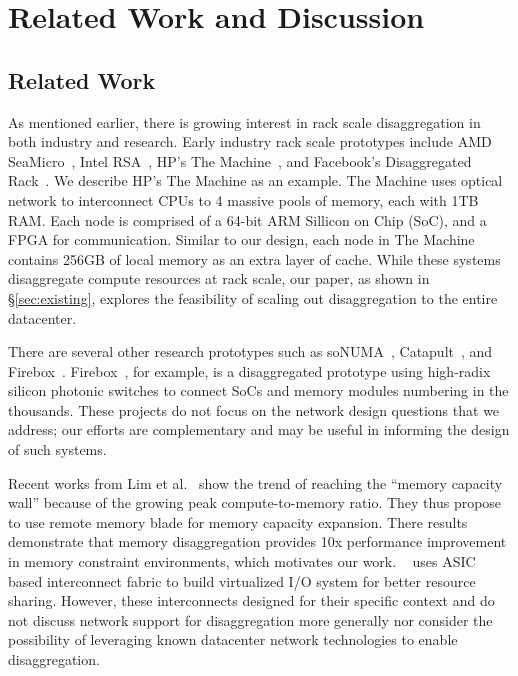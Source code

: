 \section{Related Work and Discussion}
\label{sec:discussion}

\subsection{Related Work}
 As mentioned earlier, there is growing interest in rack scale disaggregation in both industry and research.
Early industry rack scale prototypes include AMD SeaMicro~\cite{seamicro}, Intel RSA~\cite{rsa}, HP's The Machine~\cite{hptm}, and Facebook's Disaggregated Rack~\cite{fdr}.
We describe HP's The Machine as an example. 
The Machine uses optical network to interconnect CPUs to 4 massive pools of memory, each with 1TB RAM.
Each node is comprised of a 64-bit ARM Sillicon on Chip (SoC), and a FPGA for communication. 
Similar to our design, each node in The Machine contains 256GB of local memory as an extra layer of cache.
While these systems disaggregate compute resources at rack scale, our paper, as shown in \S \ref{sec:existing}, explores the feasibility of scaling out disaggregation to the entire datacenter.


There are several other research prototypes such as soNUMA~\cite{sonuma}, Catapult~\cite{catapult}, and Firebox~\cite{firebox}.
Firebox~\cite{firebox}, for example, is a disaggregated prototype using high-radix silicon photonic switches to connect SoCs and memory modules numbering in the thousands.
These projects do not focus on the network design questions that we address; our efforts are complementary and may be useful in informing the design of such systems.


Recent works from Lim et al.~\cite{ddcHwDesign1, ddcHwDesign2} show the trend of reaching the ``memory capacity wall'' because of the growing peak compute-to-memory ratio. 
They thus propose to use remote memory blade for memory capacity expansion. 
There results demonstrate that memory disaggregation provides 10x performance improvement in memory constraint environments, which motivates our work.
~\cite{ddcHwDesign3} uses ASIC based interconnect fabric to build virtualized I/O system for better resource sharing. 
However, these interconnects designed for their specific context and do not discuss network support for disaggregation more generally nor consider the possibility of leveraging known datacenter network technologies to enable disaggregation.


